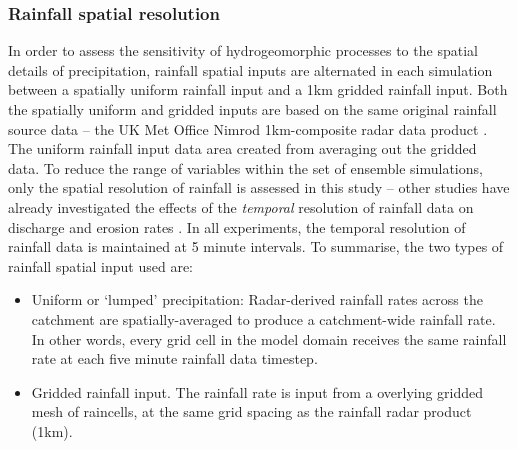 \subsubsection{Rainfall spatial resolution}
In order to assess the sensitivity of hydrogeomorphic processes to the spatial details of precipitation, rainfall spatial inputs are alternated in each simulation between a spatially uniform rainfall input and a 1km gridded rainfall input. Both the spatially uniform and gridded inputs are based on the same original rainfall source data -- the UK Met Office Nimrod 1km-composite radar data product \citep{metoffice2003nimrod}. The uniform rainfall input data area created from averaging out the gridded data. To reduce the range of variables within the set of ensemble simulations, only the spatial resolution of rainfall is assessed in this study -- other studies have already investigated the effects of the \textit{temporal} resolution of rainfall data on discharge and erosion rates \citep{nicotina2008impact,Coulthard2013,coulthard2016sensitivity}. In all experiments, the temporal resolution of rainfall data is maintained at 5 minute intervals. To summarise, the two types of rainfall spatial input used are: 

\begin{itemize}
\item Uniform or `lumped' precipitation: Radar-derived rainfall rates across the catchment are spatially-averaged to produce a catchment-wide rainfall rate. In other words, every grid cell in the model domain receives the same rainfall rate at each five minute rainfall data timestep.
\item Gridded rainfall input. The rainfall rate is input from a overlying gridded mesh of raincells, at the same grid spacing as the rainfall radar product (1km).
\end{itemize}

